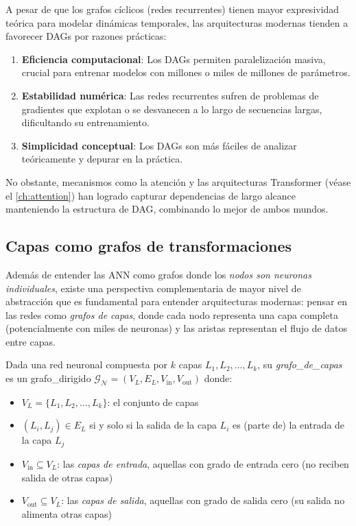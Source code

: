 A pesar de que los grafos cíclicos (redes recurrentes) tienen mayor expresividad teórica para modelar dinámicas temporales, las arquitecturas modernas tienden a favorecer \glspl{DAG} por razones prácticas:

\begin{enumerate}
    \item \textbf{Eficiencia computacional}: Los \glspl{DAG} permiten paralelización masiva, crucial para entrenar modelos con millones o miles de millones de parámetros.

    \item \textbf{Estabilidad numérica}: Las redes recurrentes sufren de problemas de gradientes que explotan o se desvanecen a lo largo de secuencias largas, dificultando su entrenamiento.

    \item \textbf{Simplicidad conceptual}: Los \glspl{DAG} son más fáciles de analizar teóricamente y depurar en la práctica.
\end{enumerate}

No obstante, mecanismos como la atención y las arquitecturas \gls{Transformer} (véase el \autoref{ch:attention}) han logrado capturar dependencias de largo alcance manteniendo la estructura de \gls{DAG}, combinando lo mejor de ambos mundos.

\subsection{Capas como grafos de transformaciones}\label{subsec:capas_grafos_transformaciones}

Además de entender las \gls{ANN} como grafos donde los \textit{nodos son neuronas individuales}, existe una perspectiva complementaria de mayor nivel de abstracción que es fundamental para entender arquitecturas modernas: pensar en las redes como \textit{grafos de capas}, donde cada nodo representa una capa completa (potencialmente con miles de neuronas) y las aristas representan el flujo de datos entre capas.

\begin{definition}\label{def:grafo_de_capas}
Dada una red neuronal compuesta por $k$ capas $L_1, L_2, \ldots, L_k$, su \textit{\gls{grafo_de_capas}} es un \gls{grafo_dirigido} $\mathcal{G}_{\mathcal{N}} = (V_L, E_L, V_{\text{in}}, V_{\text{out}})$ donde:
\begin{itemize}
    \item $V_L = \{L_1, L_2, \ldots, L_k\}$: el conjunto de capas
    \item $(L_i, L_j) \in E_L$ si y solo si la salida de la capa $L_i$ es (parte de) la entrada de la capa $L_j$
    \item $V_{\text{in}} \subseteq V_L$: las \textit{capas de entrada}, aquellas con grado de entrada cero (no reciben salida de otras capas)
    \item $V_{\text{out}} \subseteq V_L$: las \textit{capas de salida}, aquellas con grado de salida cero (su salida no alimenta otras capas)
\end{itemize}
\end{definition}

